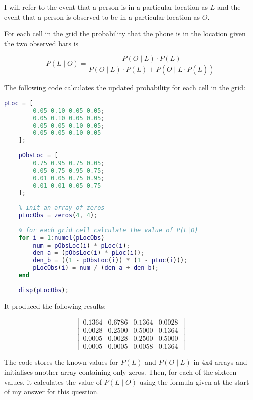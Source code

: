 \documentclass[12pt]{article}
\begin{document}
\noindent I will refer to the event that a person is in a particular location as $L$ and the event that a person is observed to be in a particular location as $O$.

\indent For each cell in the grid the probability that the phone is in the location given the two observed bars is

$$ P(L \mid O) = \frac{P(O \mid L) \cdot P(L)}{P(O \mid L) \cdot P(L) + P(O \mid \overline{L} \cdot P(\overline{L}))} $$

\indent The following code calculates the updated probability for each cell in the grid:

\begin{lstlisting}[language=Matlab]
    pLoc = [
        0.05 0.10 0.05 0.05;
        0.05 0.10 0.05 0.05;
        0.05 0.05 0.10 0.05;
        0.05 0.05 0.10 0.05
    ];
    
    pObsLoc = [
        0.75 0.95 0.75 0.05;
        0.05 0.75 0.95 0.75;
        0.01 0.05 0.75 0.95;
        0.01 0.01 0.05 0.75
    ];
    
    % init an array of zeros
    pLocObs = zeros(4, 4);
    
    % for each grid cell calculate the value of P(L|O)
    for i = 1:numel(pLocObs)
        num = pObsLoc(i) * pLoc(i);
        den_a = (pObsLoc(i) * pLoc(i));
        den_b = ((1 - pObsLoc(i)) * (1 - pLoc(i)));
        pLocObs(i) = num / (den_a + den_b);
    end
    
    disp(pLocObs);
\end{lstlisting}

\indent It produced the following results:

$$
\begin{bmatrix}
    0.1364 &0.6786 &0.1364 &0.0028 \\
    0.0028 &0.2500 &0.5000 &0.1364 \\
    0.0005 &0.0028 &0.2500 &0.5000 \\
    0.0005 &0.0005 &0.0058 &0.1364
\end{bmatrix}
$$

\indent The code stores the known values for $P(L)$ and $P(O \mid L)$ in 4x4 arrays and initialises another array containing only zeros. Then, for each of the sixteen values, it calculates the value of $P(L \mid O)$ using the formula given at the start of my answer for this question.
\end{document}
